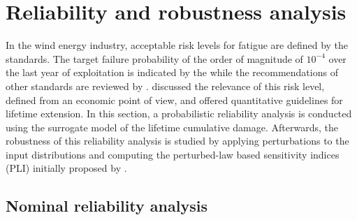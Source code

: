 \section{Reliability and robustness analysis}
In the wind energy industry, acceptable risk levels for fatigue are defined by the standards. 
The target failure probability of the order of magnitude of $10^{-4}$ over the last year of exploitation is indicated by the \citet{iec_2019} while the recommendations of other standards are reviewed by \citet{wang_2022_owt_reliability_review}. 
\citet{nielsen_2021_risk_levels} discussed the relevance of this risk level, defined from an economic point of view, and offered quantitative guidelines for lifetime extension. 
In this section, a probabilistic reliability analysis is conducted using the surrogate model of the lifetime cumulative damage. 
Afterwards, the robustness of this reliability analysis is studied by applying perturbations to the input distributions and computing the perturbed-law based sensitivity indices (PLI) initially proposed by \citet{lemaitre_2015_PLI}. 


\subsection{Nominal reliability analysis}\label{sec:owt_ra}

